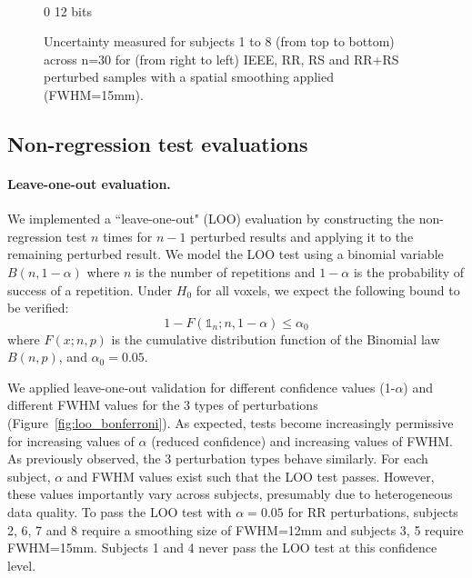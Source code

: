 \documentclass{article}
\begin{document}
\begin{landscape}
\begin{figure}
\begin{subfigure}[t]{0.2\paperheight}
        \end{subfigure} \\
        \hspace*{6cm} 0  12 bits
        \caption{Uncertainty measured for subjects 1 to 8 (from top to bottom) across n=30 for
            (from right to left) IEEE, RR, RS and RR+RS perturbed samples with a spatial smoothing applied (FWHM=15mm). }
        \label{fig:uncertainty-maps}

    \end{figure}
\end{landscape}


\subsection{Non-regression test evaluations}

\paragraph{Leave-one-out evaluation.} We implemented a ``leave-one-out" (LOO)
evaluation by constructing the non-regression test $n$ times for $n-1$ perturbed results
and applying it to the remaining perturbed result. We model the LOO test
using a binomial variable $B(n,1-\alpha)$
where $n$ is the number of repetitions and $1-\alpha$ is
the probability of success of a repetition. Under $H_0$ for all voxels, we
expect the following
bound to be verified:
\[
    1-F(\mathds{1}_n;n,1-\alpha) \leq \alpha_0
\]
where $F(x;n,p)$ is the cumulative distribution function of the Binomial law $B(n,p)$, and
$\alpha_0=0.05$.

We applied leave-one-out validation for
different  confidence values (1-$\alpha$) and different FWHM  values for the
3 types of perturbations (Figure~\ref{fig:loo_bonferroni}). As expected, tests
become increasingly permissive for increasing values of $\alpha$ (reduced
confidence) and increasing values of FWHM. As previously observed, the 3 perturbation types
behave similarly. For each subject, $\alpha$ and FWHM values exist such that
the LOO test passes. However, these values importantly vary across subjects, presumably
due to heterogeneous data quality. To pass the LOO
test with $\alpha=0.05$ for RR perturbations,
subjects 2, 6, 7 and 8 require a smoothing size of FWHM=12mm and
subjects 3, 5 require FWHM=15mm. Subjects 1 and 4 never pass the LOO test
at this confidence level.
\end{document}
